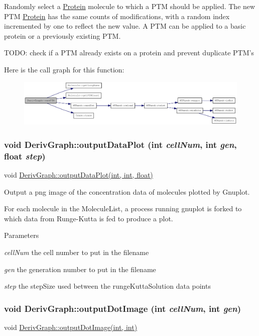 Randomly select a \hyperlink{classProtein}{Protein} molecule to which a PTM should be applied. The new PTM \hyperlink{classProtein}{Protein} has the same counts of modifications, with a random index incremented by one to reflect the new value. A PTM can be applied to a basic protein or a previously existing PTM.

TODO: check if a PTM already exists on a protein and prevent duplicate PTM's 

Here is the call graph for this function:\nopagebreak
\begin{figure}[H]
\begin{center}
\leavevmode
\includegraphics[width=420pt]{classDerivGraph_a83937a5c3ed427ebaad2bf23260c0352_cgraph}
\end{center}
\end{figure}
\hypertarget{classDerivGraph_ae435e564c1fa8370453c952b1ea5e9ab}{
\subsubsection[{outputDataPlot}]{\setlength{\rightskip}{0pt plus 5cm}void DerivGraph::outputDataPlot (int {\em cellNum}, \/  int {\em gen}, \/  float {\em step})}}
\label{classDerivGraph_ae435e564c1fa8370453c952b1ea5e9ab}
void \hyperlink{classDerivGraph_ae435e564c1fa8370453c952b1ea5e9ab}{DerivGraph::outputDataPlot(int, int, float)}

Output a png image of the concentration data of molecules plotted by Gnuplot.

For each molecule in the MoleculeList, a process running gnuplot is forked to which data from Runge-\/Kutta is fed to produce a plot.


\begin{DoxyParams}{Parameters}
\item[{\em cellNum}]the cell number to put in the filename \item[{\em gen}]the generation number to put in the filename \item[{\em step}]the stepSize used between the rungeKuttaSolution data points \end{DoxyParams}
\hypertarget{classDerivGraph_a2e2ed79e21c6896a859cc7800d950809}{
\subsubsection[{outputDotImage}]{\setlength{\rightskip}{0pt plus 5cm}void DerivGraph::outputDotImage (int {\em cellNum}, \/  int {\em gen})}}
\label{classDerivGraph_a2e2ed79e21c6896a859cc7800d950809}
void \hyperlink{classDerivGraph_a2e2ed79e21c6896a859cc7800d950809}{DerivGraph::outputDotImage(int, int)}

